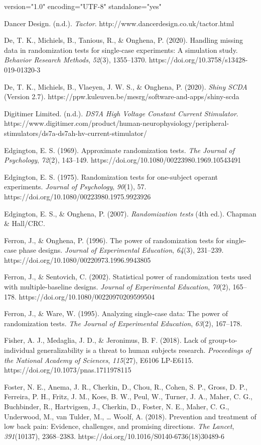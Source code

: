 version="1.0" encoding="UTF-8" standalone="yes" \documentclass{article}
\begin{document}
Dancer Design. (n.d.). \emph{Tactor}. http://www.dancerdesign.co.uk/tactor.html

De, T. K., Michiels, B., Tanious, R., \& Onghena, P. (2020). Handling missing data in randomization tests for single-case experiments: A simulation study. \emph{Behavior Research Methods}, \emph{52}(3), 1355--1370. https://doi.org/10.3758/s13428-019-01320-3

De, T. K., Michiels, B., Vlaeyen, J. W. S., \& Onghena, P. (2020). \emph{Shiny SCDA} (Version 2.7). https://ppw.kuleuven.be/mesrg/software-and-apps/shiny-scda

Digitimer Limited. (n.d.). \emph{DS7A High Voltage Constant Current Stimulator}. https://www.digitimer.com/product/human-neurophysiology/peripheral-stimulators/ds7a-ds7ah-hv-current-stimulator/

Edgington, E. S. (1969). Approximate randomization tests. \emph{The Journal of Psychology}, \emph{72}(2), 143--149. https://doi.org/10.1080/00223980.1969.10543491

Edgington, E. S. (1975). Randomization tests for one-subject operant experiments. \emph{Journal of Psychology}, \emph{90}(1), 57. https://doi.org/10.1080/00223980.1975.9923926

Edgington, E. S., \& Onghena, P. (2007). \emph{Randomization tests} (4th ed.). Chapman \& Hall/CRC.

Ferron, J., \& Onghena, P. (1996). The power of randomization tests for single-case phase designs. \emph{Journal of Experimental Education}, \emph{64}(3), 231--239. https://doi.org/10.1080/00220973.1996.9943805

Ferron, J., \& Sentovich, C. (2002). Statistical power of randomization tests used with multiple-baseline designs. \emph{Journal of Experimental Education}, \emph{70}(2), 165--178. https://doi.org/10.1080/00220970209599504

Ferron, J., \& Ware, W. (1995). Analyzing single-case data: The power of randomization tests. \emph{The Journal of Experimental Education}, \emph{63}(2), 167--178.

Fisher, A. J., Medaglia, J. D., \& Jeronimus, B. F. (2018). Lack of group-to-individual generalizability is a threat to human subjects research. \emph{Proceedings of the National Academy of Sciences}, \emph{115}(27), E6106 LP-E6115. https://doi.org/10.1073/pnas.1711978115

Foster, N. E., Anema, J. R., Cherkin, D., Chou, R., Cohen, S. P., Gross, D. P., Ferreira, P. H., Fritz, J. M., Koes, B. W., Peul, W., Turner, J. A., Maher, C. G., Buchbinder, R., Hartvigsen, J., Cherkin, D., Foster, N. E., Maher, C. G., Underwood, M., van Tulder, M., … Woolf, A. (2018). Prevention and treatment of low back pain: Evidence, challenges, and promising directions. \emph{The Lancet}, \emph{391}(10137), 2368--2383. https://doi.org/10.1016/S0140-6736(18)30489-6
\end{document}
